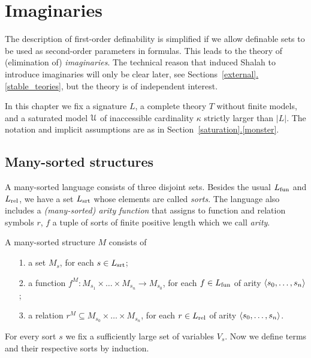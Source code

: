 \documentclass[creche.tex]{subfiles}
\begin{document}
\chapter{Imaginaries}
\label{imaginary}


\def\medrel#1{\parbox[t]{6ex}{$\displaystyle\hfil #1$}}
\def\ceq#1#2#3{\parbox[t]{25ex}{$\displaystyle #1$}\medrel{#2}{$\displaystyle #3$}}


\def\vl{\mr}

The description of first-order definability is simplified if we allow definable sets to be used as second-order parameters in formulas.
This leads to the theory of (elimination of) \textit{imaginaries}.
The technical reason that induced Shalah to introduce imaginaries will only be clear later, see Sections~\hyperref[stable_teories]{\ref*{external}.\ref*{stable_teories}}, but the theory is of independent interest.

In this chapter we fix a signature $L$, a complete theory $T$ without finite models, and a saturated model $\EuScript U$ of inaccessible cardinality $\kappa$ strictly larger than $|L|$.
The notation and implicit assumptions are as in Section~\hyperref[monster]{\ref*{saturation}.\ref*{monster}}.

\section{Many-sorted structures}
\label{many-sorted}
\def\Ar{{\rm Ar}}

A many-sorted language consists of three disjoint sets.
Besides the usual $L_{\rm fun}$ and $L_{\rm rel}$, we have a set $L_{\rm srt}$  whose elements are called \emph{sorts}.
The language also includes a \emph{(many-sorted) arity function} that assigns to function and relation symbols $r$, $f$ a tuple of sorts of finite positive length which we call \emph{arity}.

A many-sorted structure $M$ consists of
\begin{itemize}
\item[1.] a set $M_s$, for each $s\in L_{\rm srt}$;
\item[2.] a function $f^M:M_{s_1}\times\dots\times M_{s_n}\to M_{s_0}$, for each $f\in L_{\rm fun}$ of arity $\langle s_0,\dots,s_n\rangle$;
\item[3.] a relation $r^M\subseteq M_{s_0}\times\dots\times M_{s_n}$, for each $r\in L_{\rm rel}$ of arity $\langle s_0,\dots,s_n\rangle$.
\end{itemize}

For every sort $s$ we fix a sufficiently large set of variables $V_s$.
Now we define terms and their respective sorts by induction.
\end{document}

